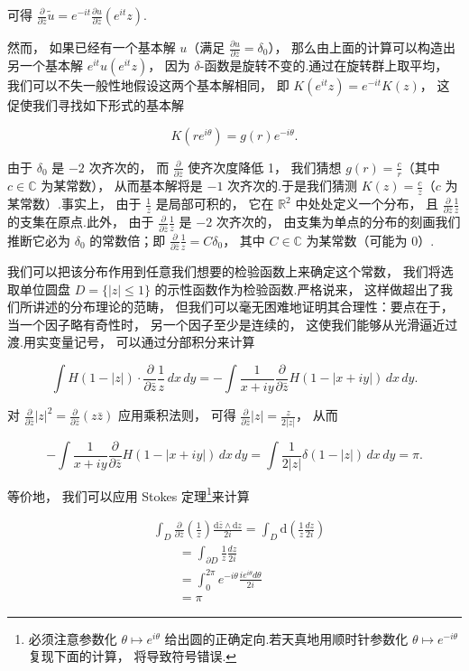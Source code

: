 可得 $\frac{\partial}{\partial \bar{z}}\tilde{u} = e^{-it}\frac{\partial u}{\partial \bar{z}}(e^{it}z)$.

然而， 如果已经有一个基本解 $u$（满足 $\frac{\partial u}{\partial \bar{z}} = \delta_{0}$）， 那么由上面的计算可以构造出另一个基本解 $e^{it}u(e^{it}z)$， 因为 $\delta$-函数是旋转不变的.通过在旋转群上取平均， 我们可以不失一般性地假设这两个基本解相同， 即 $K(e^{it}z) = e^{-it}K(z)$， 这促使我们寻找如下形式的基本解

\[
K(re^{i\theta}) = g(r)e^{-i\theta}.
\]

由于 $\delta_{0}$ 是 $-2$ 次齐次的， 而 $\frac{\partial}{\partial \bar{z}}$ 使齐次度降低 1， 我们猜想 $g(r) = \frac{c}{r}$（其中 $c \in \mathbb{C}$ 为某常数）， 从而基本解将是 $-1$ 次齐次的.于是我们猜测 $K(z) = \frac{c}{z}$（$c$ 为某常数）.事实上， 由于 $\frac{1}{z}$ 是局部可积的， 它在 $\mathbb{R}^{2}$ 中处处定义一个分布， 且 $\frac{\partial}{\partial \bar{z}}\frac{1}{z}$ 的支集在原点.此外， 由于 $\frac{\partial}{\partial \bar{z}}\frac{1}{z}$ 是 $-2$ 次齐次的， 由支集为单点的分布的刻画我们推断它必为 $\delta_{0}$ 的常数倍；即 $\frac{\partial}{\partial \bar{z}}\frac{1}{z} = C\delta_{0}$， 其中 $C \in \mathbb{C}$ 为某常数（可能为 0）.

我们可以把该分布作用到任意我们想要的检验函数上来确定这个常数， 我们将选取单位圆盘 $D = \{|z| \leq 1\}$ 的示性函数作为检验函数.严格说来， 这样做超出了我们所讲述的分布理论的范畴， 但我们可以毫无困难地证明其合理性：要点在于， 当一个因子略有奇性时， 另一个因子至少是连续的， 这使我们能够从光滑逼近过渡.用实变量记号， 可以通过分部积分来计算

\[
\int H(1-|z|) \cdot \frac{\partial}{\partial \bar{z}}\frac{1}{z}\, dx\, dy = -\int \frac{1}{x+iy}\frac{\partial}{\partial \bar{z}}H(1-|x+iy|)\, dx\, dy.
\]

对 $\frac{\partial}{\partial \bar{z}}|z|^{2} = \frac{\partial}{\partial \bar{z}}(z\bar{z})$ 应用乘积法则， 可得 $\frac{\partial}{\partial \bar{z}}|z| = \frac{z}{2|z|}$， 从而

\[
-\int \frac{1}{x+iy}\frac{\partial}{\partial \bar{z}}H(1-|x+iy|)\, dx\, dy = \int \frac{1}{2|z|}\delta(1-|z|)\, dx\, dy = \pi.
\]

等价地， 我们可以应用 Stokes 定理\footnote{必须注意参数化 $\theta \mapsto e^{i\theta}$ 给出圆的正确定向.若天真地用顺时针参数化 $\theta \mapsto e^{-i\theta}$ 复现下面的计算， 将导致符号错误.}来计算

\[
\begin{aligned}
&\int_{D}\frac{\partial}{\partial \bar{z}}\left(\frac{1}{z}\right)\frac{\mathrm{d}\bar{z} \wedge \mathrm{d}z}{2i} = \int_{D}\mathrm{d}\left(\frac{1}{z}\frac{dz}{2i}\right) \\
&\qquad = \int_{\partial D}\frac{1}{z}\frac{dz}{2i} \\
&\qquad = \int_{0}^{2\pi}e^{-i\theta}\frac{ie^{i\theta}d\theta}{2i} \\
&\qquad = \pi
\end{aligned}
\]

